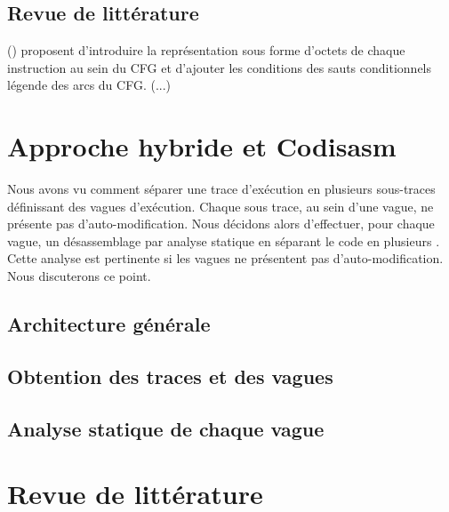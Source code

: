 \subsection{Revue de littérature}
() proposent d'introduire la représentation sous forme d'octets de chaque instruction au sein du CFG et d'ajouter les conditions des sauts conditionnels légende des arcs du CFG. (...)

\section{Approche hybride et Codisasm}
Nous avons vu comment séparer une trace d'exécution en plusieurs sous-traces définissant des vagues d'exécution.
Chaque sous trace, au sein d'une vague, ne présente pas d'auto-modification.
Nous décidons alors d'effectuer, pour chaque vague, un désassemblage par analyse statique en séparant le code en plusieurs \layers. Cette analyse est pertinente si les vagues ne présentent pas d'auto-modification. Nous discuterons ce point.

\subsection{Architecture générale}
\subsection{Obtention des traces et des vagues}
\subsection{Analyse statique de chaque vague}

\section{Revue de littérature}
